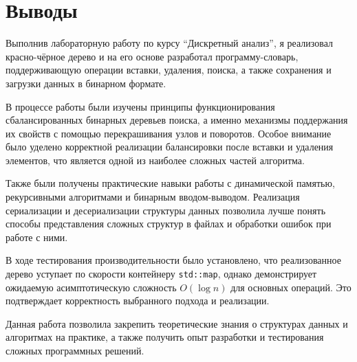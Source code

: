 \section{Выводы}

Выполнив лабораторную работу по курсу \enquote{Дискретный анализ}, я реализовал красно-чёрное дерево и на его основе разработал программу-словарь, поддерживающую операции вставки, удаления, поиска, а также сохранения и загрузки данных в бинарном формате.

В процессе работы были изучены принципы функционирования сбалансированных бинарных деревьев поиска, а именно механизмы поддержания их свойств с помощью перекрашивания узлов и поворотов. Особое внимание было уделено корректной реализации балансировки после вставки и удаления элементов, что является одной из наиболее сложных частей алгоритма.

Также были получены практические навыки работы с динамической памятью, рекурсивными алгоритмами и бинарным вводом-выводом. Реализация сериализации и десериализации структуры данных позволила лучше понять способы представления сложных структур в файлах и обработки ошибок при работе с ними.

В ходе тестирования производительности было установлено, что реализованное дерево уступает по скорости контейнеру \texttt{std::map}, однако демонстрирует ожидаемую асимптотическую сложность $O(\log n)$ для основных операций. Это подтверждает корректность выбранного подхода и реализации.

Данная работа позволила закрепить теоретические знания о структурах данных и алгоритмах на практике, а также получить опыт разработки и тестирования сложных программных решений.
\pagebreak